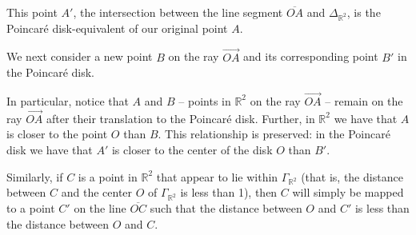 \documentclass[12pt]{article}
\newcommand{\R}{\mathbb{R}}
\newcommand{\poincare}{Poincar\'{e} }
\theoremstyle{plain}
\theoremstyle{definition}
\begin{document}
\begin{appendices}
\begin{center}
\end{center}

This point $A'$, the intersection between the line segment $\overline{OA}$ and $\Delta_{\R^2}$, is the \poincare disk-equivalent of our original point $A$.

We next consider a new point $B$ on the ray $\overrightarrow{OA}$ and its corresponding point $B'$ in the \poincare disk. 

\begin{center}
\end{center}

In particular, notice that $A$ and $B$ -- points in $\R^2$ on the ray $\overrightarrow{OA}$ -- remain on the ray $\overrightarrow{OA}$ after their translation to the \poincare disk. Further, in $\R^2$ we have that $A$ is closer to the point $O$ than $B$. This relationship is preserved: in the \poincare disk we have that $A'$ is closer to the center of the disk $O$ than $B'$. 


Similarly, if $C$ is a point in $\R^2$ that appear to lie within $\Gamma_{\R^2}$ (that is, the distance between $C$ and the center $O$ of $\Gamma_{\R^2}$ is less than 1), then $C$ will simply be mapped to a point $C'$ on the line $\overline{OC}$ such that the distance between $O$ and $C'$ is less than the distance between $O$ and $C$. 


\end{appendices}
\end{document}
